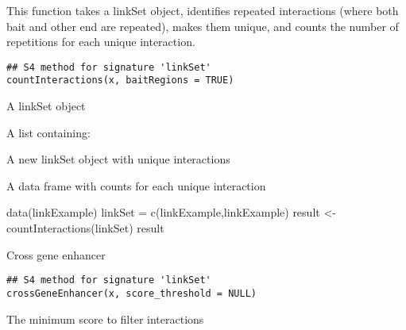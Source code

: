 \documentclass[letterpaper]{book}
\begin{document}
%
\begin{Description}
This function takes a linkSet object, identifies repeated interactions
(where both bait and other end are repeated), makes them unique, and
counts the number of repetitions for each unique interaction.
\end{Description}
%
\begin{Usage}
\begin{verbatim}
## S4 method for signature 'linkSet'
countInteractions(x, baitRegions = TRUE)
\end{verbatim}
\end{Usage}
%
\begin{Arguments}
\begin{ldescription}
\item[\code{x}] A linkSet object
\end{ldescription}
\end{Arguments}
%
\begin{Value}
A list containing:
\begin{ldescription}
\item[\code{unique\_linkSet}] A new linkSet object with unique interactions
\item[\code{interaction\_counts}] A data frame with counts for each unique interaction
\end{ldescription}
\end{Value}
%
\begin{Examples}
\begin{ExampleCode}
data(linkExample)
linkSet = c(linkExample,linkExample)
result <- countInteractions(linkSet)
result

\end{ExampleCode}
\end{Examples}
%
\begin{Description}
Cross gene enhancer
\end{Description}
%
\begin{Usage}
\begin{verbatim}
## S4 method for signature 'linkSet'
crossGeneEnhancer(x, score_threshold = NULL)
\end{verbatim}
\end{Usage}
%
\begin{Arguments}
\begin{ldescription}
\item[\code{score\_threshold}] The minimum score to filter interactions
\end{ldescription}
\end{Arguments}
\end{document}
